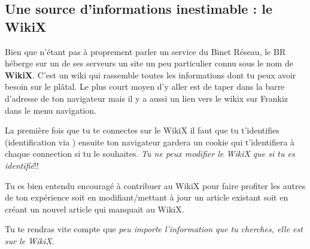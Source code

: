 
\subsection{Une source d'informations inestimable : le WikiX}
\label{WikiX}
Bien que n'\'etant pas \`a proprement parler un service du Binet R\'eseau, le BR h\'eberge sur un de ses serveurs un site un peu particulier connu sous le nom de \textbf{WikiX}. C'est un wiki qui rassemble toutes les informations dont tu peux avoir besoin sur le pl\^atal. Le plus court moyen d'y aller est de taper  dans la barre d'adresse de ton navigateur mais il y a aussi un lien vers le wikix sur Frankiz dans le menu navigation.

La premi\`ere fois que tu te connectes sur le WikiX il faut que tu t'identifies (identification via ) ensuite ton navigateur gardera un cookie qui t'identifiera \`a chaque connection si tu le souhaites. \emph{Tu ne peux modifier le WikiX que si tu es identifi\'e}!!

Tu es bien entendu encourag\'e \`a contribuer au WikiX pour faire profiter les autres de ton exp\'erience soit en modifiant/mettant \`a jour un article existant soit en cr\'eant un nouvel article qui manquait au WikiX.


Tu te rendras vite compte que \emph{peu importe l'information que tu cherches, elle est sur le WikiX.}
